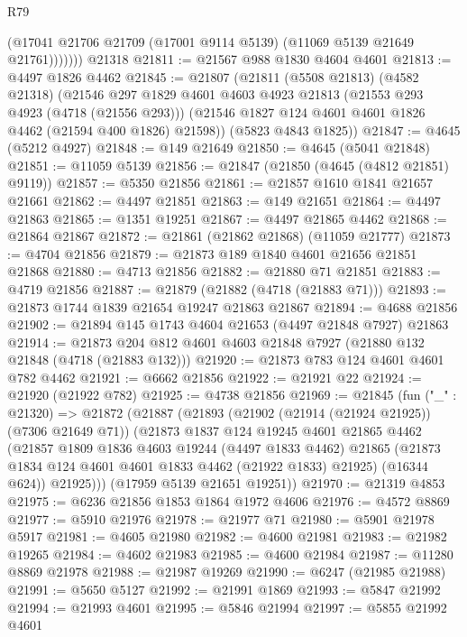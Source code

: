 \begin{lexlean}{R79}
\begin{coremodule}
              (@17041 @21706 @21709 (@17001 @9114 @5139) (@11069 @5139 @21649 @21761)))))))
    @21318
@21811 := @21567 @988 @1830 @4604 @4601
@21813 := @4497 @1826 @4462
@21845 := @21807
    (@21811
      (@5508 @21813)
      (@4582 @21318)
      (@21546
        @297
        @1829
        @4601
        @4603
        @4923
        @21813
        (@21553 @293 @4923 (@4718 (@21556 @293)))
        (@21546 @1827 @124 @4601 @4601 @1826 @4462 (@21594 @400 @1826) @21598))
      (@5823 @4843 @1825))
@21847 := @4645 (@5212 @4927)
@21848 := @149 @21649
@21850 := @4645 (@5041 @21848)
@21851 := @11059 @5139
@21856 := @21847 (@21850 (@4645 (@4812 @21851) @9119))
@21857 := @5350 @21856
@21861 := @21857 @1610 @1841 @21657 @21661
@21862 := @4497 @21851
@21863 := @149 @21651
@21864 := @4497 @21863
@21865 := @1351 @19251
@21867 := @4497 @21865 @4462
@21868 := @21864 @21867
@21872 := @21861 (@21862 @21868) (@11059 @21777)
@21873 := @4704 @21856
@21879 := @21873 @189 @1840 @4601 @21656 @21851 @21868
@21880 := @4713 @21856
@21882 := @21880 @71 @21851
@21883 := @4719 @21856
@21887 := @21879 (@21882 (@4718 (@21883 @71)))
@21893 := @21873 @1744 @1839 @21654 @19247 @21863 @21867
@21894 := @4688 @21856
@21902 := @21894 @145 @1743 @4604 @21653 (@4497 @21848 @7927) @21863
@21914 := @21873 @204 @812 @4601 @4603 @21848 @7927 (@21880 @132 @21848 (@4718 (@21883 @132)))
@21920 := @21873 @783 @124 @4601 @4601 @782 @4462
@21921 := @6662 @21856
@21922 := @21921 @22
@21924 := @21920 (@21922 @782)
@21925 := @4738 @21856
@21969 := @21845
    (fun ("_" : @21320) =>
    @21872
      (@21887
        (@21893
          (@21902 (@21914 (@21924 @21925)) (@7306 @21649 @71))
          (@21873
            @1837
            @124
            @19245
            @4601
            @21865
            @4462
            (@21857
              @1809
              @1836
              @4603
              @19244
              (@4497 @1833 @4462)
              @21865
              (@21873 @1834 @124 @4601 @4601 @1833 @4462 (@21922 @1833) @21925)
              (@16344 @624))
            @21925)))
      (@17959 @5139 @21651 @19251))
@21970 := @21319 @4853
@21975 := @6236 @21856 @1853 @1864 @1972 @4606
@21976 := @4572 @8869
@21977 := @5910 @21976
@21978 := @21977 @71
@21980 := @5901 @21978 @5917
@21981 := @4605 @21980
@21982 := @4600 @21981
@21983 := @21982 @19265
@21984 := @4602 @21983
@21985 := @4600 @21984
@21987 := @11280 @8869 @21978
@21988 := @21987 @19269
@21990 := @6247 (@21985 @21988)
@21991 := @5650 @5127
@21992 := @21991 @1869
@21993 := @5847 @21992
@21994 := @21993 @4601
@21995 := @5846 @21994
@21997 := @5855 @21992 @4601

\end{coremodule}
\end{lexlean}
